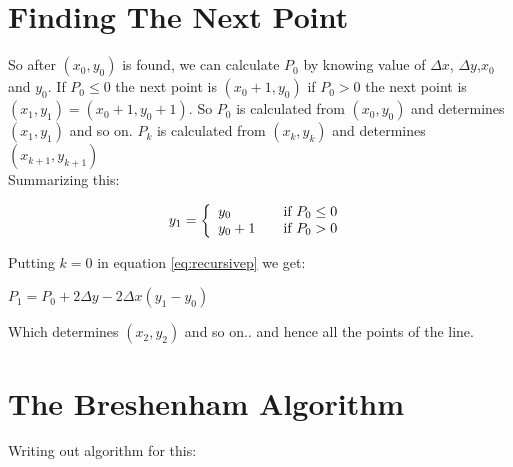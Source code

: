 \documentclass[a4paper,12pt,oneside]{book}
\begin{document}
 
\section{Finding The Next Point}
So after $(x_0,y_0)$ is found, we can calculate $P_0$ by knowing value of $\Delta x$, $\Delta y$,$x_0$ and $y_0$. If $P_0\leq 0$ the next point is $(x_0+1,y_0)$ if $P_0>0$ the next point is $(x_1,y_1)=(x_0+1,y_0+1)$. So $P_0$ is calculated from $(x_0,y_0)$ and determines $(x_1,y_1)$ and so on. $P_k$ is calculated from $(x_k,y_k)$ and determines $(x_{k+1},y_{k+1})$ \\ 
Summarizing this:
\begin{center}
\begin{equation}
	y_1 = \left\{
				\begin{array}{l l}
					y_0 & \quad \text{if $P_0\leq 0$ }\\
					y_0+1 & \quad \text{if $P_0>0$ }
				\end{array} 
		\right.
\end{equation}
\end{center} 
Putting $k=0$ in equation \ref{eq:recursivep} we get:
\begin{center}
	$P_1=P_0+2\Delta y-2\Delta x (y_1-y_0)$
\end{center}

Which determines $(x_2,y_2)$ and so on.. and hence all the points of the line.

\section{The Breshenham Algorithm}
Writing out algorithm for this:
\end{document}
